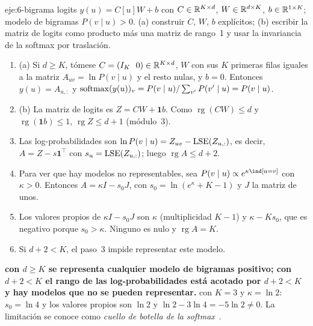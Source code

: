 \begin{solucion}{eje:6-bigrama}
\datos logits $y(u)=C[u]W+b$ con $C\in\mathbb{R}^{K\times d}$, $W\in\mathbb{R}^{d\times K}$, $b\in\mathbb{R}^{1\times K}$; modelo de bigramas $P(v\mid u)>0$.
\planteamiento (a) construir $C$, $W$, $b$ explícitos; (b) escribir la matriz de logits como producto más una matriz de rango~1 y usar la invariancia de la softmax por traslación.
\pasos
\begin{enumerate}[label=\arabic*.]
  \item (a) Si $d\ge K$, tómese $C=(I_K\ \ 0)\in\mathbb{R}^{K\times d}$, $W$ con sus $K$ primeras filas iguales a la matriz $A_{uv}=\ln P(v\mid u)$ y el resto nulas, y $b=0$. Entonces $y(u)=A_{u,:}$ y $\operatorname{softmax}(y(u))_v=P(v\mid u)/\sum_{v'}P(v'\mid u)=P(v\mid u)$.
  \item (b) La matriz de logits es $Z=CW+\mathbf 1b$. Como $\operatorname{rg}(CW)\le d$ y $\operatorname{rg}(\mathbf 1b)\le 1$, $\operatorname{rg}Z\le d+1$ (módulo~3).
  \item Las log-probabilidades son $\ln P(v\mid u)=Z_{uv}-\operatorname{LSE}(Z_{u,:})$, es decir, $A=Z-s\mathbf 1^{\top}$ con $s_u=\operatorname{LSE}(Z_{u,:})$; luego $\operatorname{rg}A\le d+2$.
  \item Para ver que hay modelos no representables, sea $P(v\mid u)\propto e^{\kappa\ind[u=v]}$ con $\kappa>0$. Entonces $A=\kappa I-s_0J$, con $s_0=\ln(e^{\kappa}+K-1)$ y $J$ la matriz de unos.
  \item Los valores propios de $\kappa I-s_0J$ son $\kappa$ (multiplicidad $K-1$) y $\kappa-Ks_0$, que es negativo porque $s_0>\kappa$. Ninguno es nulo y $\operatorname{rg}A=K$.
  \item Si $d+2<K$, el paso~3 impide representar este modelo.
\end{enumerate}
\resultado \textbf{con $d\ge K$ se representa cualquier modelo de bigramas positivo; con $d+2<K$ el rango de las log-probabilidades está acotado por $d+2<K$ y hay modelos que no se pueden representar.}
\comprobacion con $K=3$ y $\kappa=\ln 2$: $s_0=\ln 4$ y los valores propios son $\ln 2$ y $\ln 2-3\ln 4=-5\ln 2\neq 0$. La limitación se conoce como \emph{cuello de botella de la softmax}~\cite{yang}.
\end{solucion}
